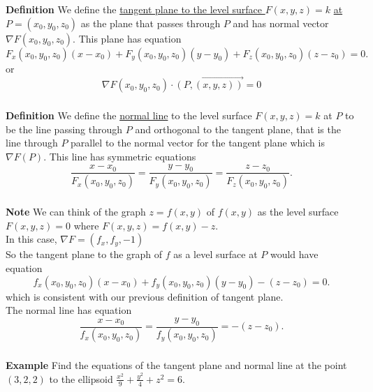 \begin{frame}[fragile]\frametitle{}
\textbf{Definition}
 We define the \underline{tangent plane to the level surface $F(x,y,z)=k$} \underline{at $P=(x_0,y_0,z_0)$} as the plane that passes through $P$ and has normal vector $\nabla F(x_0,y_0,z_0)$.  This plane has equation
 $$
   F_x(x_0,y_0,z_0) (x-x_0) + F_y(x_0,y_0,z_0) (y-y_0) + F_z(x_0,y_0,z_0) (z-z_0) = 0.
 $$ 
 or 
 $$
 \nabla F(x_0,y_0,z_0) \cdot \overrightarrow{(P,(x,y,z))}  = 0
 $$
 
\end{frame}



\begin{frame}[fragile]\frametitle{}
\textbf{Definition}
 We define the \underline{normal line} to the level surface $F(x,y,z)=k$ at $P$ to be the line passing through $P$ and orthogonal to the tangent plane,  that is the line through $P$ parallel to the normal vector for the tangent plane which is $\nabla F(P)$.  This line has symmetric equations
 $$
   \frac{x-x_0}{F_x(x_0,y_0,z_0)} = \frac{y-y_0}{F_y(x_0,y_0,z_0)} = \frac{z-z_0}{F_z(x_0,y_0,z_0)}.
 $$
 
\end{frame}


\begin{frame}[fragile]\frametitle{}
\textbf{Note}
 We can think of the graph $z=f(x,y)$ of $f(x,y)$ as the level surface $F(x,y,z)=0$ where $F(x,y,z)=f(x,y)-z$. \\ 
 In this case, $\nabla F = (f_x,f_y,-1)$  \\ 
 So the tangent plane to the graph of $f$ as a level surface at $P$ would have equation 
 $$
  f_x(x_0,y_0,z_0) (x-x_0) + f_y(x_0,y_0,z_0) (y-y_0) - (z-z_0) = 0.
$$
 which is consistent with our previous definition of tangent plane.  \\ 
 The normal line has equation
 $$
   \frac{x-x_0}{f_x(x_0,y_0,z_0)} = \frac{y-y_0}{f_y(x_0,y_0,z_0)} = -(z-z_0).
 $$

\end{frame}


\begin{frame}[fragile]\frametitle{}
 \textbf{Example}
 Find the equations of the tangent plane and normal line at the point $(3,2,2)$ to the ellipsoid $\frac{x^2}{9} + \frac{y^2}{4} + z^2 = 6$.

\end{frame}

